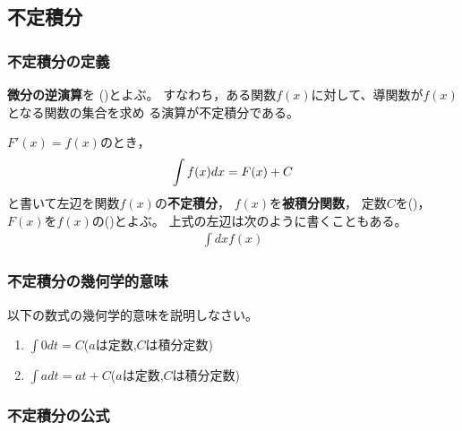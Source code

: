 \documentclass[twocolumn,11pt]{jarticle}
\begin{document}
\subsection{不定積分}

\subsubsection{不定積分の定義}
\textbf{微分の逆演算}を
()とよぶ。
すなわち，ある関数$f(x)$に対して、導関数が$f(x)$となる関数の集合を求め
る演算が不定積分である。

$F'(x)=f(x)$のとき，
\begin{align}
  \int f(x)dx=F(x)+C\notag
\end{align}
と書いて左辺を関数$f(x)$の\textbf{不定積分}，
$f(x)$を\textbf{被積分関数}，
定数$C$を()，
$F(x)$を$f(x)$の()とよぶ。
上式の左辺は次のように書くこともある。
\begin{align*}
  \int dx f(x)
\end{align*}


\subsubsection{不定積分の幾何学的意味}
\nquestion
以下の数式の幾何学的意味を説明しなさい。
\begin{enumerate}
\item $\displaystyle\int 0 dt=C$\quad ($a$は定数,$C$は積分定数)
\item $\displaystyle\int a dt=at+C$\quad ($a$は定数,$C$は積分定数)
\end{enumerate}


\subsubsection{不定積分の公式\label{sec:integration-formula}}
\end{document}
